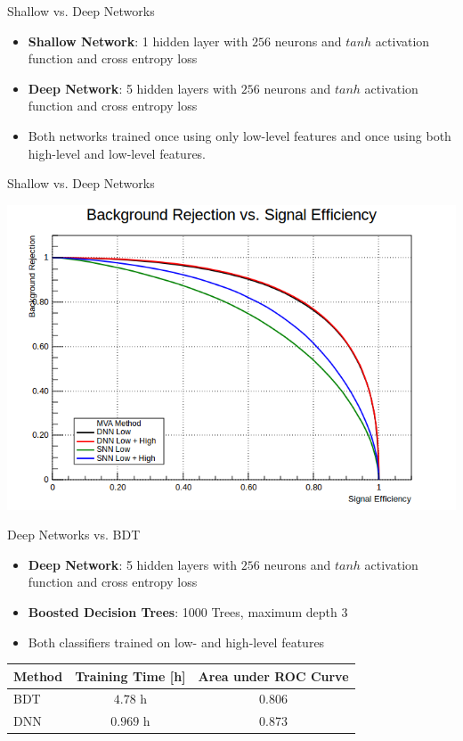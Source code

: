\documentclass{beamer}
\begin{document}
\begin{frame}{Shallow vs. Deep Networks}
  \begin{itemize}
    \item \textbf{Shallow Network}: 1 hidden layer with $256$ neurons and $tanh$
      activation function and cross entropy loss
    \item \textbf{Deep Network}: 5 hidden layers with $256$ neurons and $tanh$
      activation function and cross entropy loss
    \item Both networks trained once using only low-level features and once using
      both high-level and low-level features.
 \end{itemize}
\end{frame}
\begin{frame}{Shallow vs. Deep Networks}
  \begin{center}
    \includegraphics[width=0.8\linewidth]{dnn_low_high}
 \end{center}
\end{frame}
\begin{frame}{Deep Networks vs. BDT}
  \begin{itemize}
    \item \textbf{Deep Network}: 5 hidden layers with $256$ neurons and $tanh$
      activation function and cross entropy loss
    \item \textbf{Boosted Decision Trees}: 1000 Trees, maximum depth 3
    \item Both classifiers trained on low- and high-level features
 \end{itemize}
 \vskip 1cm
 \begin{center}
 \begin{tabular}{|l|c|c|}
   \hline
   Method & Training Time [h] & Area under ROC Curve \\
   \hline
   BDT & $4.78$ h & 0.806 \\
   DNN & $0.969$ h & 0.873 \\
   \hline
 \end{tabular}
 \end{center}
\end{frame}
\end{document}
